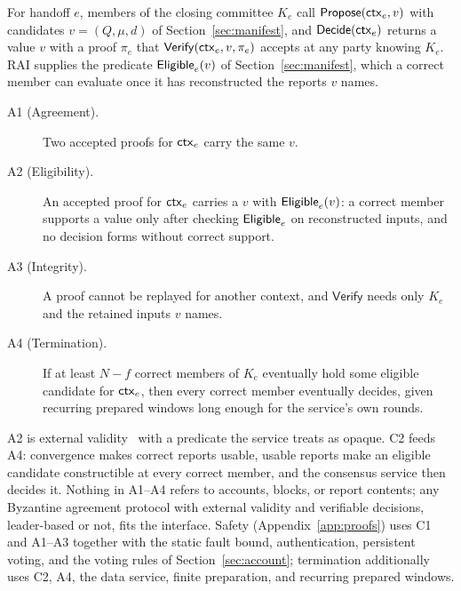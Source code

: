 For handoff $e$, members of the closing committee $K_e$ call $\mathsf{Propose}(\mathsf{ctx}_e,v)$ with candidates $v=(Q,\mu,d)$ of Section~\ref{sec:manifest}, and $\mathsf{Decide}(\mathsf{ctx}_e)$ returns a value $v$ with a proof $\pi_e$ that $\mathsf{Verify}(\mathsf{ctx}_e,v,\pi_e)$ accepts at any party knowing $K_e$. RAI supplies the predicate $\mathsf{Eligible}_e(v)$ of Section~\ref{sec:manifest}, which a correct member can evaluate once it has reconstructed the reports $v$ names.
\begin{description}
\item[A1 (Agreement).] Two accepted proofs for $\mathsf{ctx}_e$ carry the same $v$.
\item[A2 (Eligibility).] An accepted proof for $\mathsf{ctx}_e$ carries a $v$ with $\mathsf{Eligible}_e(v)$: a correct member supports a value only after checking $\mathsf{Eligible}_e$ on reconstructed inputs, and no decision forms without correct support.
\item[A3 (Integrity).] A proof cannot be replayed for another context, and $\mathsf{Verify}$ needs only $K_e$ and the retained inputs $v$ names.
\item[A4 (Termination).] If at least $N-f$ correct members of $K_e$ eventually hold some eligible candidate for $\mathsf{ctx}_e$, then every correct member eventually decides, given recurring prepared windows long enough for the service's own rounds.
\end{description}
A2 is external validity~\cite{externalvalidity} with a predicate the service treats as opaque. C2 feeds A4: convergence makes correct reports usable, usable reports make an eligible candidate constructible at every correct member, and the consensus service then decides it. Nothing in A1--A4 refers to accounts, blocks, or report contents; any Byzantine agreement protocol with external validity and verifiable decisions, leader-based or not, fits the interface. Safety (Appendix~\ref{app:proofs}) uses C1 and A1--A3 together with the static fault bound, authentication, persistent voting, and the voting rules of Section~\ref{sec:account}; termination additionally uses C2, A4, the data service, finite preparation, and recurring prepared windows.
